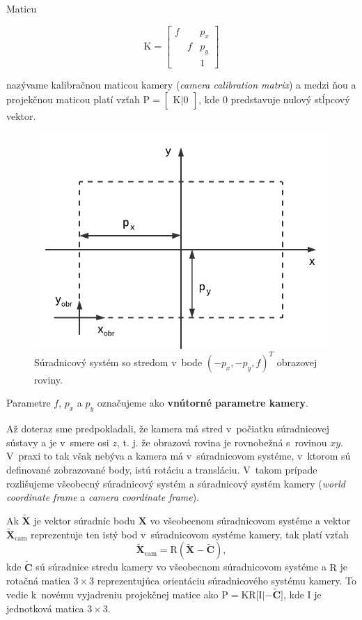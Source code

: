 Maticu

$$ \mathrm{K} 
=
\begin{bmatrix}
f &   &  p_x \\
  & f &  p_y \\
  &   &   1  
\end{bmatrix}
$$

nazývame kalibračnou maticou kamery (\emph{camera calibration matrix}) a medzi ňou a projekčnou maticou platí vzťah
$\mathrm{P} = \begin{bmatrix} \mathrm{K} | 0 \end{bmatrix}$, kde $0$ predstavuje nulový stĺpcový vektor.

\begin{figure}[h!]
    \centering
    \includegraphics[width=0.7\linewidth]{text_prace/obrazky-figures/model_kamery3.pdf}
    \caption{Súradnicový systém so stredom v~bode $(-p_x, -p_y, f)^T$ obrazovej roviny.}
    \label{fig:model_kamery3}
\end{figure}


Parametre $f$, $p_x$ a $p_y$ označujeme ako \textbf{vnútorné parametre kamery}.

Až doteraz sme predpokladali, že kamera má stred v~počiatku súradnicovej sústavy a je  v~smere osi $z$, t. j. že obrazová rovina je rovnobežná s~rovinou $xy$. V~praxi to tak však nebýva a kamera má v~súradnicovom systéme, v~ktorom sú definované zobrazované body, istú rotáciu a transláciu. V~takom prípade rozlišujeme všeobecný súradnicový systém a súradnicový systém kamery (\emph{world coordinate frame} a \emph{camera coordinate frame}).

Ak $\widetilde{\mathbf{X}}$ je vektor súradníc bodu $\mathbf{X}$ vo všeobecnom súradnicovom systéme a vektor $\widetilde{\mathbf{X}}_{\mathrm{cam}}$ reprezentuje ten istý bod v~súradnicovom systéme kamery, tak platí vzťah 
$$\widetilde{\mathbf{X}}_{\mathrm{cam}} = \mathrm{R} (\widetilde{\mathbf{X}} - \widetilde{\mathbf{C}}),$$ 
kde $\widetilde{\mathbf{C}}$ sú súradnice stredu kamery vo všeobecnom súradnicovom systéme a $\mathrm{R}$ je rotačná matica $3 \times 3$ reprezentujúca orientáciu súradnicového systému kamery. To vedie k~novému vyjadreniu projekčnej matice ako $\mathrm{P} = \mathrm{K} \mathrm{R} \bigl[ \mathrm{I} | - \widetilde{\mathbf{C}} \bigr]$, kde $\mathrm{I}$ je jednotková matica $3 \times 3$.

